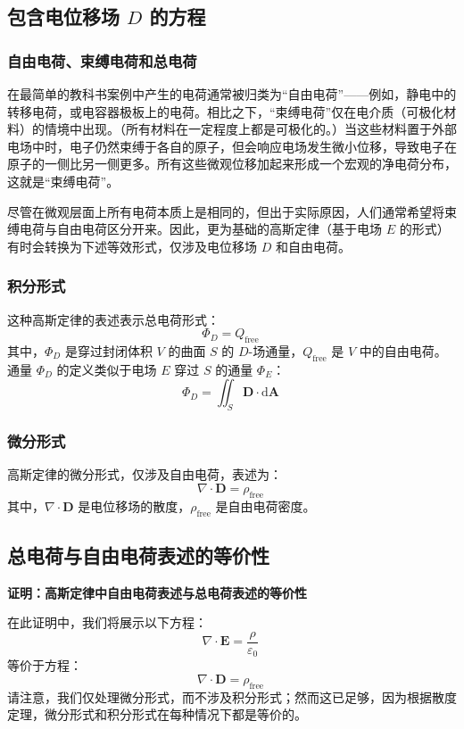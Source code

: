 \subsection{包含电位移场 \( D \) 的方程}
\subsubsection{自由电荷、束缚电荷和总电荷}  

在最简单的教科书案例中产生的电荷通常被归类为“自由电荷”——例如，静电中的转移电荷，或电容器极板上的电荷。相比之下，“束缚电荷”仅在电介质（可极化材料）的情境中出现。（所有材料在一定程度上都是可极化的。）当这些材料置于外部电场中时，电子仍然束缚于各自的原子，但会响应电场发生微小位移，导致电子在原子的一侧比另一侧更多。所有这些微观位移加起来形成一个宏观的净电荷分布，这就是“束缚电荷”。

尽管在微观层面上所有电荷本质上是相同的，但出于实际原因，人们通常希望将束缚电荷与自由电荷区分开来。因此，更为基础的高斯定律（基于电场 \( E \) 的形式）有时会转换为下述等效形式，仅涉及电位移场 \( D \) 和自由电荷。
\subsubsection{积分形式}

这种高斯定律的表述表示总电荷形式：
\[
\Phi_{D} = Q_{\mathrm{free}}~
\]
其中，\(\Phi_{D}\) 是穿过封闭体积 \(V\) 的曲面 \(S\) 的 \(D\)-场通量，\(Q_{\mathrm{free}}\) 是 \(V\) 中的自由电荷。通量 \(\Phi_{D}\) 的定义类似于电场 \(E\) 穿过 \(S\) 的通量 \(\Phi_{E}\)：
\[
\Phi_{D} = \iint_{S} \mathbf{D} \cdot \mathrm{d} \mathbf{A}~
\]
\subsubsection{微分形式}

高斯定律的微分形式，仅涉及自由电荷，表述为：
\[
\nabla \cdot \mathbf{D} = \rho_{\mathrm{free}}~
\]
其中，\(\nabla \cdot \mathbf{D}\) 是电位移场的散度，\(\rho_{\mathrm{free}}\) 是自由电荷密度。
\subsection{总电荷与自由电荷表述的等价性}

\textbf{证明：高斯定律中自由电荷表述与总电荷表述的等价性}

在此证明中，我们将展示以下方程：
\[
\nabla \cdot \mathbf{E} = \frac{\rho}{\varepsilon_0}~
\]
等价于方程：
\[
\nabla \cdot \mathbf{D} = \rho_{\mathrm{free}}~
\]
请注意，我们仅处理微分形式，而不涉及积分形式；然而这已足够，因为根据散度定理，微分形式和积分形式在每种情况下都是等价的。

